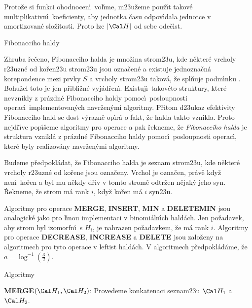 \flushpar Proto\v ze si funkci ohodnocen\'\i\ vol\'\i me, 
m\accent23u\v zeme pou\v z\'\i t takov\'e multiplikativn\'\i\ 
koeficienty, aby jednotka \v casu odpov\'\i dala jednotce v 
amortizovan\'e slo\v zitosti. Proto lze $|\Cal H|$ od sebe ode\v c\'\i st.

\heading
Fibonacciho haldy
\endheading

\flushpar Zhruba \v re\v ceno, Fibonacciho halda je mno\v zina 
strom\accent23u, kde n\v ekter\'e vrcholy r\accent23uzn\'e od 
ko\v ren\accent23u strom\accent23u jsou ozna\v cen\'e a existuje 
jednozna\v cn\'a korepondence mezi prvky $S$ a vrcholy 
strom\accent23u takov\'a, \v ze spl\v nuje podm\'\i nku 
. Bohu\v zel toto je jen p\v ribli\v z\-n\'e vyj\'ad\v ren\'\i . 
Existuj\'\i\ takov\'eto struktury, kter\'e nevznikly z pr\'azd\-n\'e 
Fibonacciho haldy pomoc\'\i\ posloupnosti ope\-rac\'\i\ 
implementovan\'ych navr\v zen\'ymi algoritmy. P\v ritom 
d\accent23ukaz efekti\-vity Fibonacciho hald se dost 
v\'yrazn\v e op\'\i r\'a o fakt, \v ze halda takto vznikla. Proto 
nejd\v r\'\i ve pop\'\i\v seme algoritmy pro operace a pak \v rekneme, 
\v ze \emph{Fibonacciho} \emph{halda} je struktura vznikl\'a 
z pr\'azdn\'e Fibonacciho haldy pomoc\'\i\ posloupnosti operac\'\i , 
kter\'e byly realizov\'any navr\v zen\'ymi algoritmy.
\medskip

\flushpar Budeme p\v redpokl\'adat, \v ze Fibonacciho halda je 
seznam strom\accent23u, kde n\v ekter\'e vrcholy 
r\accent23uzn\'e od ko\v rene jsou ozna\v ceny.  Vrchol je 
ozna\v cen, pr\'av\v e kdy\v z nen\'\i\ ko\v ren a byl mu n\v ekdy d\v r\'\i v v tomto 
strom\v e odtr\v zen n\v ejak\'y jeho syn.  \v Rekneme, \v ze strom m\'a rank $
i$, 
kdy\v z ko\v ren m\'a $i$ syn\accent23u.  
\medskip

\flushpar Algoritmy pro operace {\bf MERGE}, {\bf INSERT}, {\bf MIN} a 
{\bf DELE\-TEMIN} jsou analogick\'e jako pro l\'\i nou implementaci 
v binomi\'aln\'\i ch hald\'ach. Jen po\v zadavek, aby strom byl 
izomorfn\'\i\ s $H_i$, je nahrazen po\v zadavkem, \v ze m\'a rank $
i$. 
Algoritmy pro ope\-race {\bf DECREASE}, {\bf INCREASE} a {\bf DELETE }
jsou zalo\v zeny na algoritmech pro tyto operace v leftist 
hald\'ach. V algoritmech p\v redpokl\'ad\'ame, \v ze $a=\log^{-1}
\left(\frac 32\right)$.
\medskip

\subhead
Algoritmy
\endsubhead
\smallskip

{\bf MERGE$\left(\Cal H_1,\Cal H_2\right)$}:\newline 
Provedeme konkatenaci seznam\accent23u $\Cal H_1$ a $\Cal H_2$.
\bigskip

